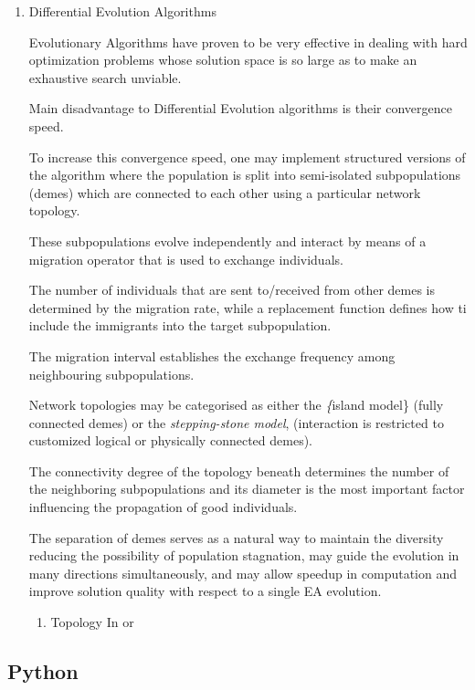 \documentclass[11pt]{article}
\begin{document}
\begin{enumerate}
\item Differential Evolution Algorithms
\label{sec:orgdfd5f58}

Evolutionary Algorithms have proven to be very effective in dealing
with hard optimization problems whose solution space is so large as
to make an exhaustive search unviable. 

Main disadvantage to Differential Evolution algorithms is their
convergence speed. 

To increase this convergence speed, one may implement structured
versions of the algorithm where the population is split into
semi-isolated subpopulations (demes) which are connected to each other
using a particular network topology. 

These subpopulations evolve independently and interact by means of a
migration operator that is used to exchange individuals. 

The number of individuals that are sent to/received from other demes
is determined by the migration rate, while a replacement function
defines how ti include the immigrants into the target subpopulation. 

The migration interval establishes the exchange frequency among
neighbouring subpopulations. 

Network topologies may be categorised as either the \emph\{island
model\} (fully connected demes) or the \emph{stepping-stone model},
(interaction is restricted to customized logical or physically
connected demes).  

The connectivity degree of the topology beneath determines
the number of the neighboring subpopulations and its diameter is the
most important factor influencing the propagation of good individuals.

The separation of demes serves as a natural way to maintain the diversity
reducing the possibility of population stagnation, may guide the evolution
in many directions simultaneously, and may allow speedup in computation and
improve solution quality with respect to a single EA evolution.

\begin{enumerate}
\item Topology
\label{sec:org6301b43}
In or
\end{enumerate}
\end{enumerate}

\subsection{Python}
\label{sec:orgd178798}
\end{document}
